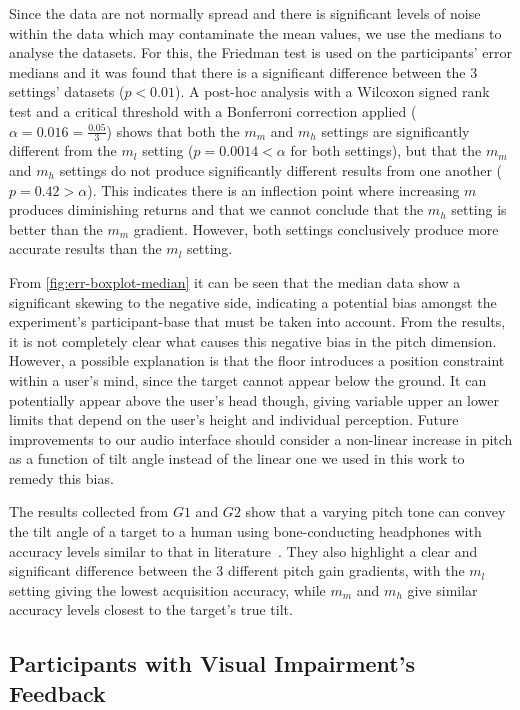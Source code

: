\documentclass{llncs}
\begin{document}
Since the data are not normally spread and there is significant levels of noise within the data which may contaminate the mean values, we use the medians to analyse the datasets.
For this, the Friedman test is used on the participants' error medians and it was found that there is a significant difference between the 3 settings' datasets ($p < 0.01$).
A post-hoc analysis with a Wilcoxon signed rank test and a critical threshold with a Bonferroni correction applied ($\alpha=0.016=\frac{0.05}{3}$) shows that both the $m_m$ and $m_h$ settings are significantly different from the $m_l$ setting ($p=0.0014<\alpha$ for both settings), but that the $m_m$ and $m_h$ settings do not produce significantly different results from one another ($p=0.42>\alpha$).
This indicates there is an inflection point where increasing $m$ produces diminishing returns and that we cannot conclude that the $m_h$ setting is better than the $m_m$ gradient.
However, both settings conclusively produce more accurate results than the $m_l$ setting.

From \cref{fig:err-boxplot-median} it can be seen that the median data show a significant skewing to the negative side, indicating a potential bias amongst the experiment's participant-base that must be taken into account.
From the results, it is not completely clear what causes this negative bias in the pitch dimension.
However, a possible explanation is that the floor introduces a position constraint within a user's mind, since the target cannot appear below the ground.
It can potentially appear above the user's head though, giving variable upper an lower limits that depend on the user's height and individual perception.
Future improvements to our audio interface should consider a non-linear increase in pitch as a function of tilt angle instead of the linear one we used in this work to remedy this bias.

The results collected from $G1$ and $G2$ show that a varying pitch tone can convey the tilt angle of a target to a human using bone-conducting headphones with accuracy levels similar to that in literature~\cite{bujacz2011sonification,katz2011spatial,zotkin2004rendering}.
They also highlight a clear and significant difference between the 3 different pitch gain gradients, with the $m_l$ setting giving the lowest acquisition accuracy, while $m_m$ and $m_h$ give similar accuracy levels closest to the target's true tilt. 

\subsection{Participants with Visual Impairment's Feedback}
\end{document}
